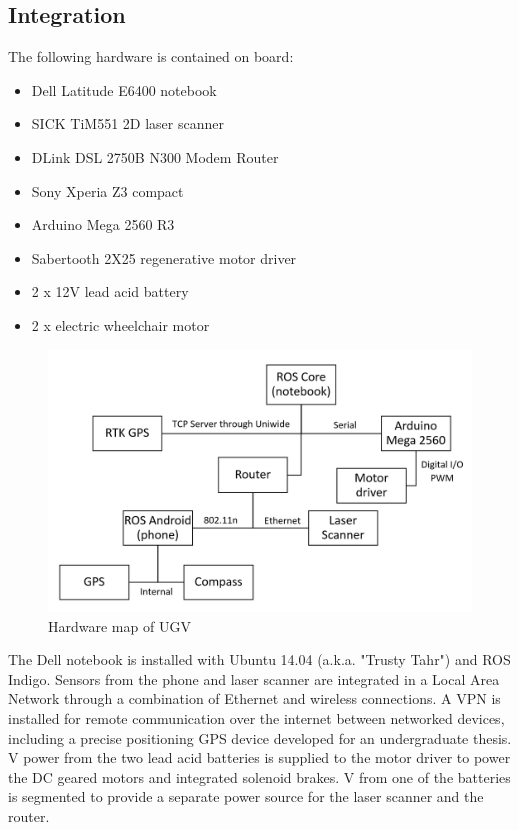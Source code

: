 \documentclass[titlepage,12pt,a4paper]{article}
\begin{document}
\subsection{Integration}

The following hardware is contained on board:

\begin{itemize}
	\item Dell Latitude E6400 notebook
	\item SICK TiM551 2D laser scanner
	\item DLink DSL 2750B N300 Modem Router
	\item Sony Xperia Z3 compact
	\item Arduino Mega 2560 R3
	\item Sabertooth 2X25 regenerative motor driver
	\item 2 x 12V lead acid battery
	\item 2 x electric wheelchair motor
\end{itemize}

\begin{figure}[h!]
	\centering
	\includegraphics[scale=0.6]{figures/hardware_chart.png}
	\caption{Hardware map of UGV}
	\label{figure:hardware_chart}
\end{figure}

The Dell notebook is installed with Ubuntu 14.04 (a.k.a. "Trusty Tahr") and ROS Indigo. Sensors from the phone and laser scanner are integrated in a Local Area Network through a combination of Ethernet and wireless connections. A VPN is installed for remote communication over the internet between networked devices, including a precise positioning GPS device developed for an undergraduate thesis. \unit[24]{V} power from the two lead acid batteries is supplied to the motor driver to power the DC geared motors and integrated solenoid brakes. \unit[12]{V} from one of the batteries is segmented to provide a separate power source for the laser scanner and the router.
\end{document}
